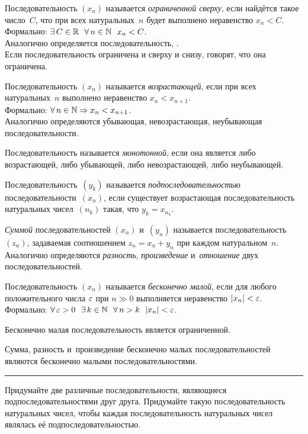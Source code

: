 \documentclass[a4paper,12pt]{article}
\begin{document}

Последовательность $(x_n)$ называется \emph{ограниченной сверху}, если найдётся такое число~$C$, что при всех натуральных~$n$ будет выполнено неравенство $x_n<C$.\\
Формально: $\exists \, C\in\mathbb{R} \ \ \forall\, n\in\mathbb{N} \ \ x_n<C$.\\
Аналогично определяется последовательность, .\\
Если последовательность ограничена и сверху и снизу, говорят, что она  ограничена.

Последовательность $(x_n)$ называется \emph{возрастающей}, если при всех натуральных~$n$ выполнено неравенство $x_n<x_{n+1}$.\\
Формально: $\forall\, n\in\mathbb{N} \Rightarrow x_n<x_{n+1}$.\\
Аналогично определяются  убывающая,  невозрастающая,  неубывающая последовательности.

Последовательность называется \emph{монотонной}, если она является либо возрастающей, либо убывающей, либо невозрастающей, либо неубывающей.

Последовательность~$(y_k)$ называется \emph{подпоследовательностью} последовательности~$(x_n)$, если существует возрастающая последовательность натуральных чисел~$(n_k)$ такая, что $y_k=x_{n_k}$.

\emph{Суммой} последовательностей $(x_n)$ и~$(y_n)$ называется последовательность $(z_n)$, задаваемая соотношением $z_n=x_n+y_n$ при каждом натуральном~$n$. Аналогично определяются \emph{разность}, \emph{произведение} и~\emph{отношение} двух последовательностей.

Последовательность $(x_n)$ называется \emph{бесконечно малой}, если для любого положительного числа $\varepsilon$ при $n\gg0$ выполняется неравенство $|x_n|<\varepsilon$.\\
Формально: $\forall\,\ep>0\ \ \exists\,k\in\N\ \ \forall\,n>k \ \ |x_n|<\ep$.

Бесконечно малая последовательность является ограниченной.

Сумма, разность и~произведение бесконечно малых последовательностей являются бесконечно малыми последовательностями.

\bigskip
\hrule
\bigskip

 Придумайте две различные последовательности, являющиеся подпоследовательностями друг друга.
 Придумайте такую последовательность натуральных чисел, чтобы каждая последовательность натуральных чисел являлась её подпоследовательностью.
\end{document}
